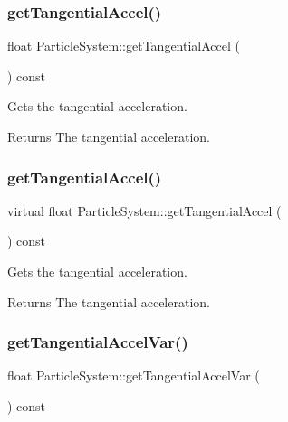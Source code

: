 \subsubsection{\texorpdfstring{get\+Tangential\+Accel()}{getTangentialAccel()}\hspace{0.1cm}{\footnotesize\ttfamily [1/2]}}
{\footnotesize\ttfamily float Particle\+System\+::get\+Tangential\+Accel (\begin{DoxyParamCaption}{ }\end{DoxyParamCaption}) const\hspace{0.3cm}{\ttfamily [virtual]}}

Gets the tangential acceleration.

\begin{DoxyReturn}{Returns}
The tangential acceleration. 
\end{DoxyReturn}
\mbox{\label{classParticleSystem_adf8cc5ea0d80bbfd392dc91615b18c8e}} 
\subsubsection{\texorpdfstring{get\+Tangential\+Accel()}{getTangentialAccel()}\hspace{0.1cm}{\footnotesize\ttfamily [2/2]}}
{\footnotesize\ttfamily virtual float Particle\+System\+::get\+Tangential\+Accel (\begin{DoxyParamCaption}{ }\end{DoxyParamCaption}) const\hspace{0.3cm}{\ttfamily [virtual]}}

Gets the tangential acceleration.

\begin{DoxyReturn}{Returns}
The tangential acceleration. 
\end{DoxyReturn}
\mbox{\label{classParticleSystem_acde1d993d42f6436509b8187e5dd6330}} 
\subsubsection{\texorpdfstring{get\+Tangential\+Accel\+Var()}{getTangentialAccelVar()}\hspace{0.1cm}{\footnotesize\ttfamily [1/2]}}
{\footnotesize\ttfamily float Particle\+System\+::get\+Tangential\+Accel\+Var (\begin{DoxyParamCaption}{ }\end{DoxyParamCaption}) const\hspace{0.3cm}{\ttfamily [virtual]}}

